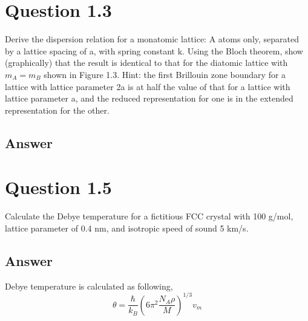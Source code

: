 \documentclass[
	12pt, %
]{fphw}
\begin{document}
\section*{Question 1.3}

\begin{problem}
Derive the dispersion relation for a monatomic lattice: A atoms only,
separated by a lattice spacing of a, with spring constant k. Using the
Bloch theorem, show (graphically) that the result is identical to that
for the diatomic lattice with $m_A = m_B$ shown in Figure 1.3. Hint: the
first Brillouin zone boundary for a lattice with lattice parameter 2a
is at half the value of that for a lattice with lattice parameter a, and
the reduced representation for one is in the extended representation
for the other.

\end{problem}


\subsection*{Answer}



\section*{Question 1.5}

\begin{problem}
Calculate the Debye temperature for a fictitious FCC crystal with 100
g/mol, lattice parameter of 0.4 nm, and isotropic speed of sound 5
km/s.
\end{problem}


\subsection*{Answer} 
Debye temperature is calculated as following,
\begin{equation}
	\theta=\frac{\hbar}{k_{B}}\left(6 \pi^{2} \frac{N_{A} \rho}{M}\right)^{1 / 3} v_{m}
	\end{equation}


\end{document}

